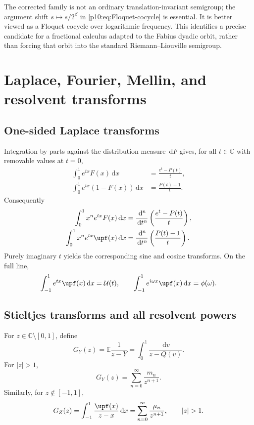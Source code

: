 \documentclass[11pt,oneside]{article}
\theoremstyle{definition}
\theoremstyle{remark}
\newcommand{\F}{F}
\newcommand{\Q}{Q}
\newcommand{\E}{\mathbb E}
\newcommand{\C}{\mathbb C}
\newcommand{\dd}{\,\mathrm d}
\newcommand{\1}{\mathbf 1}
\begin{document}
\begin{remark}
The corrected family is not an ordinary translation-invariant semigroup; the argument
shift \(s\mapsto s/2^\beta\) in \eqref{p10:eq:Floquet-cocycle} is essential.  It is better
viewed as a Floquet cocycle over logarithmic frequency.  This identifies a precise
candidate for a fractional calculus adapted to the Fabius dyadic orbit, rather than
forcing that orbit into the standard Riemann--Liouville semigroup.
\end{remark}


\section{Laplace, Fourier, Mellin, and resolvent transforms}

\subsection{One-sided Laplace transforms}

Integration by parts against the distribution measure \(\dd\F\) gives, for all
\(t\in\C\) with removable values at \(t=0\),
\begin{align}
 \int_0^1e^{tx}\F(x)\dd x
 &=\frac{e^t-P(t)}t,
 \label{p10:eq:Laplace-F}\\
 \int_0^1e^{tx}(1-\F(x))\dd x
 &=\frac{P(t)-1}t.
 \label{p10:eq:Laplace-up-half}
\end{align}
Consequently
\begin{align}
 \int_0^1x^ne^{tx}\F(x)\dd x
 &=\frac{\dd^n}{\dd t^n}\left(\frac{e^t-P(t)}t\right),
 \label{p10:eq:exp-poly-F}\\
 \int_0^1x^ne^{tx}\upf(x)\dd x
 &=\frac{\dd^n}{\dd t^n}\left(\frac{P(t)-1}t\right).
 \label{p10:eq:exp-poly-up}
\end{align}
Purely imaginary \(t\) yields the corresponding sine and cosine transforms.  On the
full line,
\begin{equation}\label{p10:eq:bilateral-up-transform}
 \int_{-1}^1e^{tx}\upf(x)\dd x=\mathcal U(t),
 \qquad
 \int_{-1}^1e^{i\omega x}\upf(x)\dd x=\phi(\omega).
\end{equation}

\subsection{Stieltjes transforms and all resolvent powers}

For \(z\in\C\setminus[0,1]\), define
\begin{equation}\label{p10:eq:GY-def}
 G_Y(z)=\E\frac1{z-Y}
 =\int_0^1\frac{\dd v}{z-\Q(v)}.
\end{equation}
For \(|z|>1\),
\begin{equation}\label{p10:eq:GY-moment-series}
 G_Y(z)=\sum_{n=0}^{\infty}\frac{m_n}{z^{n+1}}.
\end{equation}
Similarly, for \(z\notin[-1,1]\),
\begin{equation}\label{p10:eq:GZ-def}
 G_Z(z)=\int_{-1}^1\frac{\upf(x)}{z-x}\dd x
 =\sum_{n=0}^{\infty}\frac{\mu_n}{z^{n+1}},
 \qquad |z|>1.
\end{equation}
\end{document}

